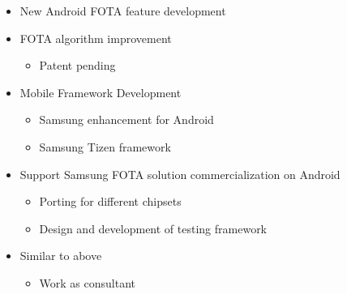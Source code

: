 \documentclass[11pt,a4paper,sans]{moderncv}        %
\begin{document}
%
\begin{itemize}%
\item New Android FOTA feature development
\item FOTA algorithm improvement
  \begin{itemize}%
  \item Patent pending
  \end{itemize}
\item Mobile Framework Development
  \begin{itemize}%
  \item Samsung enhancement for Android
  \item Samsung Tizen framework
  \end{itemize}
\item Support Samsung FOTA solution commercialization on Android
  \begin{itemize}%
  \item Porting for different chipsets
  \item Design and development of testing framework\\
  \end{itemize}
\end{itemize}
%
\begin{itemize}%
\item Similar to above
  \begin{itemize}%
  \item Work as consultant
  \end{itemize}
\end{itemize}
\end{document}
